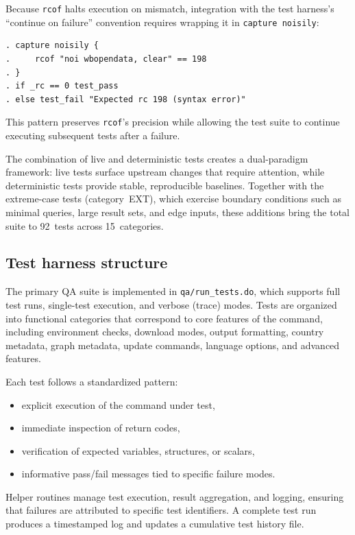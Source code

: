 \documentclass[bib]{statapress}
\begin{document}
Because \texttt{rcof} halts execution on mismatch, integration with the
test harness's ``continue on failure'' convention requires wrapping it in
\texttt{capture noisily}:

\begin{stlog}
\begin{verbatim}
. capture noisily {
.     rcof "noi wbopendata, clear" == 198
. }
. if _rc == 0 test_pass
. else test_fail "Expected rc 198 (syntax error)"
\end{verbatim}
\nullskip
\end{stlog}

\noindent This pattern preserves \texttt{rcof}'s precision while allowing the
test suite to continue executing subsequent tests after a failure.

The combination of live and deterministic tests creates a dual-paradigm
framework: live tests surface upstream changes that require attention, while
deterministic tests provide stable, reproducible baselines.  Together with the
extreme-case tests (category~EXT), which exercise boundary conditions such as
minimal queries, large result sets, and edge inputs, these additions bring the
total suite to 92~tests across 15~categories.

\subsection{Test harness structure}

The primary QA suite is implemented in \texttt{qa/run\_tests.do}, which
supports full test runs, single-test execution, and verbose (trace) modes.
Tests are organized into functional categories that
correspond to core features of the command, including environment checks,
download modes, output formatting, country metadata, graph metadata, update
commands, language options, and advanced features.

Each test follows a standardized pattern:
\begin{itemize}
  \item explicit execution of the command under test,
  \item immediate inspection of return codes,
  \item verification of expected variables, structures, or scalars,
  \item informative pass/fail messages tied to specific failure modes.
\end{itemize}

Helper routines manage test execution, result aggregation, and logging, ensuring
that failures are attributed to specific test identifiers. A complete test run
produces a timestamped log and updates a cumulative test history file.
\end{document}
